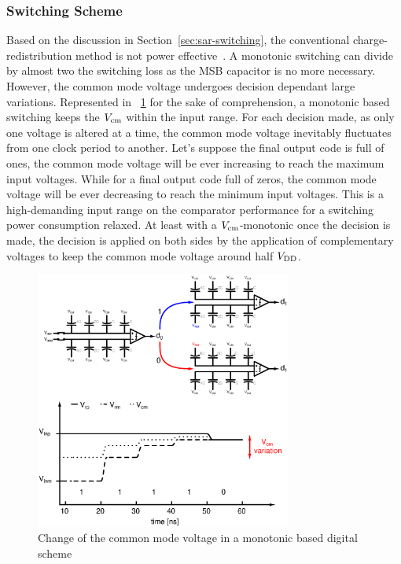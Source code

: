 	\subsubsection{Switching Scheme}        %
Based on the discussion in Section~\ref{sec:sar-switching}, the conventional charge-redistribution method is not power effective~\cite{Ginsburg2005}. A monotonic switching can divide by almost two the switching loss as the MSB capacitor is no more necessary. However, the common mode voltage undergoes decision dependant large variations. Represented in \figurename~\ref{fig:sar-vcm-change-monotonic} for the sake of comprehension, a monotonic based switching keeps the \(V_{\rm cm} \) within the input range. For each decision made, as only one voltage is altered at a time, the common mode voltage  inevitably fluctuates from one clock period to another. Let's suppose the final output code is full of ones, the common mode voltage will be ever increasing to reach the maximum input voltages. While for a final output code full of zeros, the common mode voltage will be ever decreasing to reach the minimum input voltages. This is a high-demanding input range on the comparator performance for a switching power consumption relaxed. At least with a $V_{\rm cm}$-monotonic once the decision is made, the decision is applied on both sides by the application of complementary voltages to keep the common mode voltage around half $V_{\rm DD}$.

\begin{figure}[htp]
	\centering
	\includegraphics[width=0.75\textwidth]{Chapter4/Figs/sar/sar_vcm_monotonic-vcm-change.ps}
	\caption{Change of the common mode voltage in a monotonic based digital scheme}
	\label{fig:sar-vcm-change-monotonic}
\end{figure}

